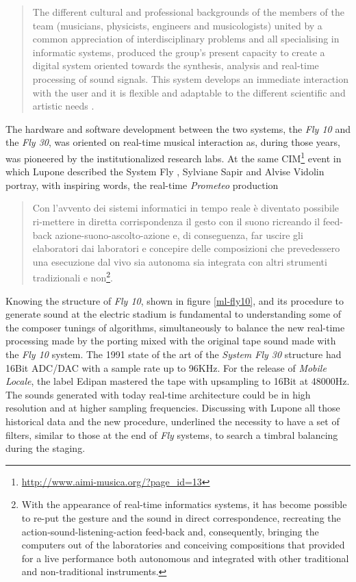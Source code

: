 \documentclass[twoside,a4paper]{article}
\begin{document}
\begin{quote}
The different cultural and professional backgrounds of the members of the team (musicians, physicists, engineers and musicologists) united by a common appreciation of interdisciplinary problems and all specialising in informatic systems, produced the group's present capacity to create a digital system oriented towards the synthesis, analysis and real-time processing of sound signals. This system develops an immediate interaction with the user and it is flexible and adaptable to the different scientific and artistic needs \cite{ml91}.
\end{quote}

The hardware and software development between the two systems, the \emph{Fly 10} and the \emph{Fly 30}, was oriented on real-time musical interaction as, during those years, was pioneered by the institutionalized research labs. At the same CIM\footnote{\url{http://www.aimi-musica.org/?page_id=13}} event in which Lupone described the System Fly \cite{ml85},  Sylviane Sapir and Alvise Vidolin \cite{savi85} portray, with inspiring words, the real-time \emph{Prometeo} production

\begin{quote}
Con l'avvento dei sistemi informatici in tempo reale è diventato possibile ri-mettere in diretta corrispondenza il gesto con il suono ricreando il feed-back azione-suono-ascolto-azione e, di conseguenza, far uscire gli elaboratori dai laboratori e concepire delle composizioni che prevedessero una esecuzione dal vivo sia autonoma sia integrata con altri strumenti tradizionali e non\footnote{With the appearance of real-time informatics systems, it has become possible to re-put the gesture and the sound in direct correspondence, recreating the action-sound-listening-action feed-back and, consequently, bringing the computers out of the laboratories and conceiving compositions that provided for a live performance both autonomous and integrated with other traditional and non-traditional instruments.}. 
\end{quote}

Knowing the structure of \emph{Fly 10}, shown in figure \ref{ml-fly10}, and its procedure to generate sound at the electric stadium is fundamental to understanding some of the composer tunings of algorithms,  simultaneously to balance the new real-time processing made by the porting mixed with the original tape sound made with the \emph{Fly 10} system. The 1991 state of the art of the \emph{System Fly 30} structure had 16Bit ADC/DAC with a sample rate up to 96KHz. For the release of \emph{Mobile Locale}, the label Edipan mastered the tape with upsampling to 16Bit at 48000Hz. The sounds generated with today real-time architecture could be in high resolution and at higher sampling frequencies. Discussing with Lupone all those historical data and the new procedure, underlined the necessity to have a set of filters, similar to those at the end of \emph{Fly} systems, to search a timbral balancing during the staging. 
\end{document}
